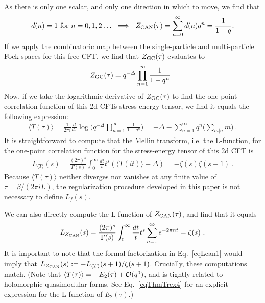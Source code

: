 \documentclass[11pt,a4paper]{article}
\newcommand{\G}{\Gamma}
\begin{document}
As there is only one scalar, and only one direction in which to move, we find that 
\begin{align}
d(n) = 1~{\rm for}~n = 0, 1, 2 \ldots~\implies~Z_{\rm CAN}(\tau) = \sum_{n = 0}^{\infty} d(n) q^n = \frac{1}{1-q} .
\end{align}
If we apply the combinatoric map between the single-particle and multi-particle Fock-spaces for this free CFT, we find that $Z_{\rm GC}(\tau)$ evaluates to 
\begin{align}
Z_{\rm GC}(\tau) = q^{-\Delta} \prod_{n = 1}^{\infty} \frac{1}{1-q^n}~.
\end{align}
Now, if we take the logarithmic derivative of $Z_{\rm GC}(\tau)$ to find the one-point correlation function of this 2d CFTs stress-energy tensor, we find it equals the following expression:
\begin{align}
\langle T(\tau) \rangle = \frac{1}{2 \pi i} \frac{d}{d\tau} \log \bigg( q^{-\Delta} \prod_{n = 1}^{\infty} \frac{1}{1-q^n}\bigg) = -\Delta - \sum_{n = 1}^{\infty} q^n \bigg( \sum_{m|n} m \bigg) ~.
\end{align}
It is straightforward to compute that the Mellin transform, i.e. the L-function, for the one-point correlation function for the stress-energy tensor of this 2d CFT is
\begin{align}
L_{\langle T \rangle}(s) = \frac{(2 \pi)^s}{\G(s)} \int_0^{\infty} \frac{dt}{t} t^s ( \langle T(it) \rangle + \Delta) = -\zeta(s) \zeta(s-1)~.
\end{align}
Because $\langle T(\tau) \rangle$ neither diverges nor vanishes at any finite value of $\tau = \beta/(2 \pi i L)$, the regularization procedure developed in this paper is not necessary to define $L_f(s)$. 

We can also directly compute the L-function of $Z_{\rm CAN}(\tau)$, and find that it equals
\begin{align}
L_{Z_{\rm CAN}}(s) = \frac{(2\pi)^s}{\G(s)} \int_0^{\infty} \frac{dt}{t} t^s \sum_{n = 1}^{\infty} e^{-2 \pi n t} = \zeta(s)~.
\end{align}
It is important to note that the formal factorization in Eq.~\eqref{eqLcan1} would imply that $L_{Z_{\rm CAN}}(s) := -L_{\langle T \rangle}(s+1)/\zeta(s+1)$. Crucially, these computations match. (Note that $\langle T (\tau) \rangle = -E_2(\tau) + {\cal O}(q^0)$, and is tightly related to holomorphic quasimodular forms. See Eq.~\eqref{eqThmTrex4} for an explicit expression for the L-function of $E_2(\tau)$.)
\end{document}
